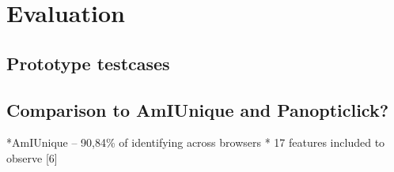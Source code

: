 \chapter{Evaluation}
\label{cha:evaluation}

\section{Prototype testcases}

\section{Comparison to AmIUnique and Panopticlick?}

*AmIUnique – 90,84\% of identifying across browsers
* 17 features included to observe
[6]
